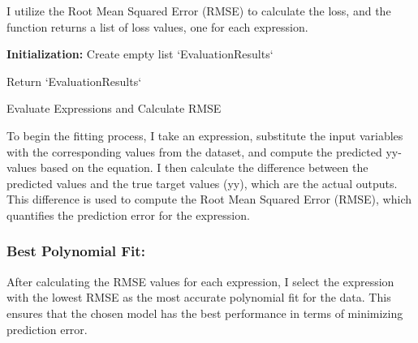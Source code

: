 \documentclass{article}
\begin{document}
I utilize the Root Mean Squared Error (RMSE) to calculate the loss, and the function returns a list of loss values, one for each expression.\\



\begin{algorithm}[H]
\SetAlgoLined
{}

\textbf{Initialization:}\;
Create empty list `EvaluationResults`\;


Return `EvaluationResults`\;

\caption{Evaluate Expressions and Calculate RMSE}
\label{alg:evaluate_expressions} %
\end{algorithm}


To begin the fitting process, I take an expression, substitute the input variables with the corresponding values from the dataset, and compute the predicted yy-values based on the equation. I then calculate the difference between the predicted values and the true target values (yy), which are the actual outputs. This difference is used to compute the Root Mean Squared Error (RMSE), which quantifies the prediction error for the expression.\\

\subsubsection{Best Polynomial Fit:}

After calculating the RMSE values for each expression, I select the expression with the lowest RMSE as the most accurate polynomial fit for the data. This ensures that the chosen model has the best performance in terms of minimizing prediction error.\\
\end{document}
